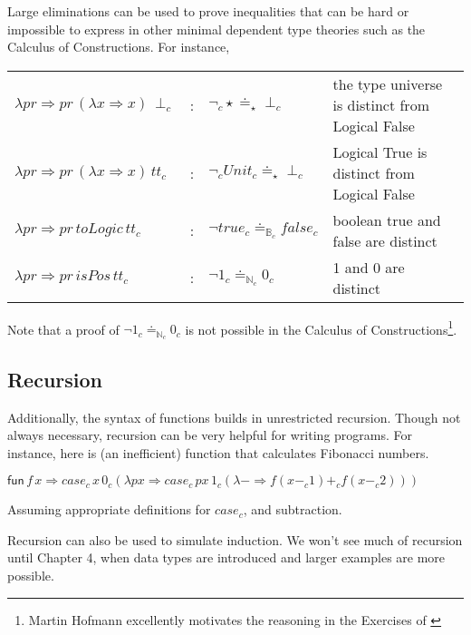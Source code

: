 Large eliminations can be used to prove inequalities that can be hard or impossible to express in other minimal dependent type theories such as the Calculus of Constructions.
For instance,

\begin{tabular}{lcll}
  $\lambda pr\Rightarrow pr\,\left(\lambda x\Rightarrow x\right)\,\perp_{c}$ & : & $\lnot_{c}\star\doteq_{\star}\perp_{c}$ & the type universe is distinct from Logical False\tabularnewline
  $\lambda pr\Rightarrow pr\,\left(\lambda x\Rightarrow x\right)\,tt_{c}$ & : & $\lnot_{c}Unit_{c}\doteq_{\star}\perp_{c}$ & Logical True is distinct from Logical False\tabularnewline
  $\lambda pr\Rightarrow pr\,toLogic\,tt_{c}$ & : & $\lnot true_{c}\doteq_{\mathbb{B}_{c}}false_{c}$ & boolean true and false are distinct\tabularnewline
  $\lambda pr\Rightarrow pr\,isPos\,tt_{c}$ & : & $\lnot1_{c}\doteq_{\mathbb{N}_{c}}0_{c}$ & 1 and 0 are distinct\tabularnewline
  \end{tabular}
  


Note that a proof of $\lnot1_{c}\doteq_{\mathbb{N}_{c}}0_{c}$ is not possible in the Calculus of Constructions\cite{10.2307/2274575}\footnote{
  Martin Hofmann excellently motivates the reasoning in the Exercises of \cite{hofmann_1997}}.

\subsection{Recursion}

Additionally, the syntax of functions builds in unrestricted recursion.
Though not always necessary, recursion can be very helpful for writing programs.
For instance, here is (an inefficient) function that calculates Fibonacci numbers.

$\mathsf{fun}\,f\,x\Rightarrow case_{c}\,x\,0_{c}\left(\lambda px\Rightarrow case_{c}\,px\,1_{c}\left(\lambda-\Rightarrow f\left(x-_{c}1\right)+_{c}f\left(x-_{c}2\right)\right)\right)$

Assuming appropriate definitions for $case_{c}$, and subtraction.

Recursion can also be used to simulate induction. 
We won't see much of recursion until Chapter 4, when data types are introduced and larger examples are more possible.

